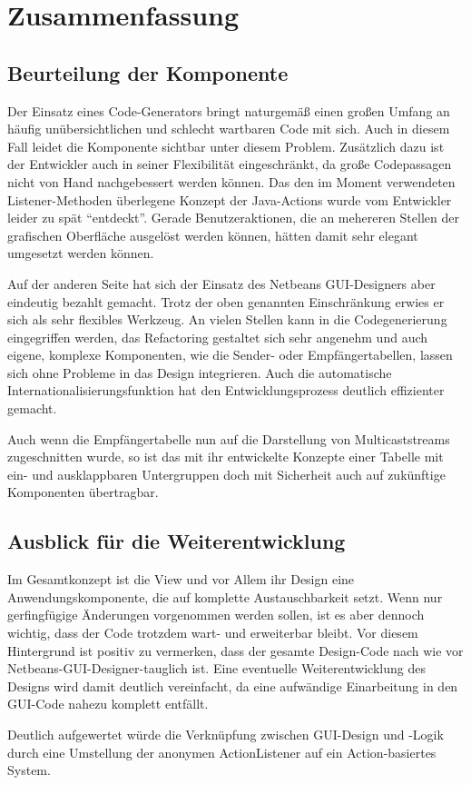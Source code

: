 \chapter{Zusammenfassung}

\section{Beurteilung der Komponente}

    Der Einsatz eines Code-Generators bringt naturgemäß einen großen Umfang an
    häufig unübersichtlichen und schlecht wartbaren Code mit sich. Auch in
    diesem Fall leidet die Komponente sichtbar unter diesem Problem. Zusätzlich
    dazu ist der Entwickler auch in seiner Flexibilität eingeschränkt, da große
    Codepassagen nicht von Hand nachgebessert werden können. Das den im Moment
    verwendeten Listener-Methoden überlegene Konzept der Java-Actions wurde vom
    Entwickler leider zu spät "`entdeckt"'. Gerade Benutzeraktionen, die an
    mehereren Stellen der grafischen Oberfläche ausgelöst werden können, hätten
    damit sehr elegant umgesetzt werden können.
    
    Auf der anderen Seite hat sich der Einsatz des Netbeans GUI-Designers aber
    eindeutig bezahlt gemacht. Trotz der oben genannten Einschränkung erwies er
    sich als sehr flexibles Werkzeug. An vielen Stellen kann in die
    Codegenerierung eingegriffen werden, das Refactoring gestaltet sich sehr
    angenehm und auch eigene, komplexe Komponenten, wie die Sender- oder
    Empfängertabellen, lassen sich ohne Probleme in das Design integrieren. Auch
    die automatische Internationalisierungsfunktion hat den Entwicklungsprozess
    deutlich effizienter gemacht.
    
    Auch wenn die Empfängertabelle nun auf die Darstellung von Multicaststreams
    zugeschnitten wurde, so ist das mit ihr entwickelte Konzepte einer Tabelle
    mit ein- und ausklappbaren Untergruppen doch mit Sicherheit auch auf
    zukünftige Komponenten übertragbar.
    
    
    

\section{Ausblick für die Weiterentwicklung}

    Im Gesamtkonzept ist die View und vor Allem ihr Design eine
    Anwendungskomponente, die auf komplette Austauschbarkeit setzt. Wenn nur
    gerfingfügige Änderungen vorgenommen werden sollen, ist es aber dennoch
    wichtig, dass der Code trotzdem wart- und erweiterbar bleibt. Vor diesem
    Hintergrund ist positiv zu vermerken, dass der gesamte
    Design-Code nach wie vor Netbeans-GUI-Designer-tauglich ist. Eine eventuelle
    Weiterentwicklung des Designs wird damit deutlich vereinfacht, da eine
    aufwändige Einarbeitung in den GUI-Code nahezu komplett entfällt.
    
    Deutlich aufgewertet würde die Verknüpfung zwischen GUI-Design und -Logik
    durch eine Umstellung der anonymen ActionListener auf ein Action-basiertes
    System.


